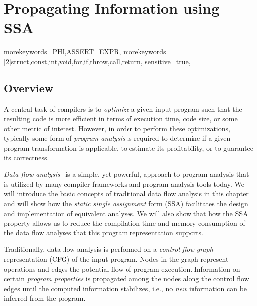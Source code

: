 \providecommand\lcode{\begingroup \small\urlstyle{tt}\Url}
\providecommand\lident{\begingroup \small\urlstyle{tt}\Url}

\chapter{Propagating Information using SSA}
\label{chapter:constant_propagation_is_easier}
\newcommand{\obacht}[2]{\marginpar{\tiny\textbf{#1:} #2}}

\graphicspath{{img/}{constant_propagation_is_easier/img/}{part3/constant_propagation_is_easier/img/}}

{
  morekeywords={PHI,ASSERT_EXPR},
  morekeywords=[2]{struct,const,int,void,for,if,throw,call,return},
  sensitive=true,
}

\lstset{
  mathescape=true,
  language=DNlisting,
  basicstyle=\small,
  keywordstyle=\ttfamily,
  keywordstyle=[2]\bfseries,
  numbers=left
}

\section{Overview}

A central task of compilers is to \emph{optimize} a given input program such
that the resulting code is more efficient in terms of execution time, code size,
or some other metric of interest. However, in order to perform these
optimizations, typically some form of \emph{program analysis} is
required to determine if a given program transformation is applicable, to
estimate its profitability, or to guarantee its correctness.

\emph{Data flow analysis}~\cite{novillo:bib:NNH99} is a simple, yet powerful,
approach to program analysis that is utilized by many compiler frameworks and
program analysis tools today. We will introduce the basic concepts of
traditional data flow analysis in this chapter and will show how the \emph{static
single assignment} form (SSA) facilitates the design and implementation of
equivalent analyses.
We will also show that how the SSA property allows us to reduce the compilation
time and memory consumption of the data flow analyses that this program
representation supports.

Traditionally, data flow analysis is performed on a \emph{control flow graph}
representation (CFG) of the input program. Nodes in the graph represent
operations and edges the potential flow of program execution.
Information on certain \emph{program properties} is propagated among
the nodes along the control flow edges until the computed information
stabilizes, i.e., no \emph{new} information can be inferred from the program.

